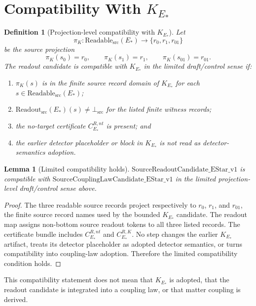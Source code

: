 \documentclass[11pt]{article}
\newcommand{\EStar}{E_{\ast}}
\newcommand{\ReadableSrc}{\mathrm{Readable}_{\mathrm{src}}}
\newcommand{\ReadoutSrc}{\mathrm{Readout}_{\mathrm{src}}}
\newcommand{\BottomSrc}{\bot_{\mathrm{src}}}
\newcommand{\KStar}{K_{E_{\ast}}}
\newtheorem{definition}{Definition}
\newtheorem{lemma}{Lemma}
\begin{document}
\section{Compatibility With \(\KStar\)}

\begin{definition}[Projection-level compatibility with \(K_{E_{\ast}}\)]
Let
\[
  \pi_K:\ReadableSrc(\EStar)\to \{r_0,r_1,r_{01}\}
\]
be the source projection
\[
  \pi_K(s_0)=r_0,\qquad
  \pi_K(s_1)=r_1,\qquad
  \pi_K(s_{01})=r_{01}.
\]
The readout candidate is compatible with \(\KStar\) in the limited
draft/control sense if:
\begin{enumerate}[leftmargin=2em]
  \item \(\pi_K(s)\) is in the finite source record domain of \(\KStar\) for
  each \(s\in\ReadableSrc(\EStar)\);
  \item \(\ReadoutSrc(\EStar)(s)\neq\BottomSrc\) for the listed finite
  witness records;
  \item the no-target certificate \(C^{R,nt}_{\EStar}\) is present; and
  \item the earlier detector placeholder or block in \(\KStar\) is not read
  as detector-semantics adoption.
\end{enumerate}
\end{definition}

\begin{lemma}[Limited compatibility holds]
\(\mathrm{SourceReadoutCandidate\_EStar\_v1}\) is compatible with
\(\mathrm{SourceCouplingLawCandidate\_EStar\_v1}\) in the limited
projection-level draft/control sense above.
\end{lemma}

\begin{proof}
The three readable source records project respectively to \(r_0\), \(r_1\),
and \(r_{01}\), the finite source record names used by the bounded
\(\KStar\) candidate. The readout map assigns non-bottom source readout
tokens to all three listed records. The certificate bundle includes
\(C^{R,nt}_{\EStar}\) and \(C^{R,K}_{\EStar}\). No step changes the earlier
\(\KStar\) artifact, treats its detector placeholder as adopted detector
semantics, or turns compatibility into coupling-law adoption. Therefore the
limited compatibility condition holds.
\end{proof}

This compatibility statement does not mean that \(\KStar\) is adopted, that
the readout candidate is integrated into a coupling law, or that matter
coupling is derived.
\end{document}
